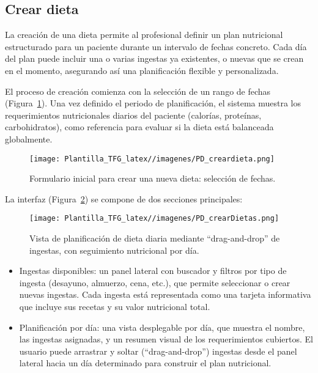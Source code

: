 \subsection{Crear dieta}
La creación de una dieta permite al profesional definir un plan nutricional estructurado para un paciente durante un intervalo de fechas concreto. 
Cada día del plan puede incluir una o varias ingestas ya existentes, o nuevas que se crean en el momento, asegurando así una planificación flexible y personalizada.

El proceso de creación comienza con la selección de un rango de fechas (Figura~\ref{fig:crear-dieta-form}). Una vez definido el periodo de planificación, el sistema muestra los requerimientos nutricionales diarios del paciente (calorías, proteínas, carbohidratos), como referencia para evaluar si la dieta está balanceada globalmente.

\begin{figure}
    \centering
    \texttt{[image: Plantilla\_TFG\_latex//imagenes/PD\_creardieta.png]}
    \caption{Formulario inicial para crear una nueva dieta: selección de fechas.}
    \label{fig:crear-dieta-form}
\end{figure}

La interfaz (Figura~\ref{fig:crear-dieta-plan}) se compone de dos secciones principales:

\begin{figure}
    \centering
    \texttt{[image: Plantilla\_TFG\_latex//imagenes/PD\_crearDietas.png]}
    \caption{Vista de planificación de dieta diaria mediante ``drag-and-drop'' de ingestas, con seguimiento nutricional por día.}
    \label{fig:crear-dieta-plan}
\end{figure}

\begin{itemize}
    \item Ingestas disponibles: un panel lateral con buscador y filtros por tipo de ingesta (desayuno, almuerzo, cena, etc.), que permite seleccionar o crear nuevas ingestas. Cada ingesta está representada como una tarjeta informativa que incluye sus recetas y su valor nutricional total.

    \item Planificación por día: una vista desplegable por día, que muestra el nombre, las ingestas asignadas, y un resumen visual de los requerimientos cubiertos. El usuario puede arrastrar y soltar (``drag-and-drop'') ingestas desde el panel lateral hacia un día determinado para construir el plan nutricional.
\end{itemize}

